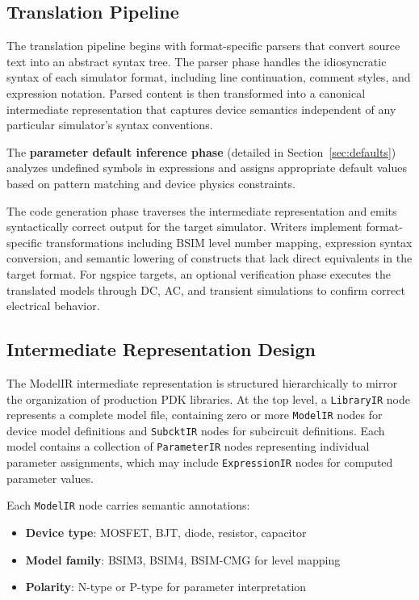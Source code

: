 \documentclass[conference]{IEEEtran}
\begin{document}
\subsection{Translation Pipeline}

The translation pipeline begins with format-specific parsers that convert source text into an abstract syntax tree. The parser phase handles the idiosyncratic syntax of each simulator format, including line continuation, comment styles, and expression notation. Parsed content is then transformed into a canonical intermediate representation that captures device semantics independent of any particular simulator's syntax conventions.

The \textbf{parameter default inference phase} (detailed in Section~\ref{sec:defaults}) analyzes undefined symbols in expressions and assigns appropriate default values based on pattern matching and device physics constraints.

The code generation phase traverses the intermediate representation and emits syntactically correct output for the target simulator. Writers implement format-specific transformations including BSIM level number mapping, expression syntax conversion, and semantic lowering of constructs that lack direct equivalents in the target format. For ngspice targets, an optional verification phase executes the translated models through DC, AC, and transient simulations to confirm correct electrical behavior.

\subsection{Intermediate Representation Design}

The ModelIR intermediate representation is structured hierarchically to mirror the organization of production PDK libraries. At the top level, a \texttt{LibraryIR} node represents a complete model file, containing zero or more \texttt{ModelIR} nodes for device model definitions and \texttt{SubcktIR} nodes for subcircuit definitions. Each model contains a collection of \texttt{ParameterIR} nodes representing individual parameter assignments, which may include \texttt{ExpressionIR} nodes for computed parameter values.

Each \texttt{ModelIR} node carries semantic annotations:
\begin{itemize}
\item \textbf{Device type}: MOSFET, BJT, diode, resistor, capacitor
\item \textbf{Model family}: BSIM3, BSIM4, BSIM-CMG for level mapping
\item \textbf{Polarity}: N-type or P-type for parameter interpretation
\end{itemize}
\end{document}
